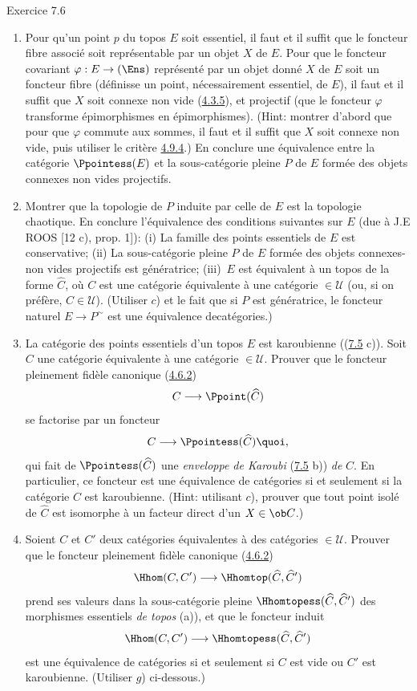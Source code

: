 \documentclass[10pt]{../fichiers-configuration-latex/smfart}
\begin{document}
\begin{enonce*}[remark]{Exercice 7.6}
\begin{enumerate}
\item Pour qu'un point $p$ du topos $E$ soit essentiel, il faut et il
suffit que le foncteur fibre associé soit représentable par un objet
$X$ de $E$. Pour que le foncteur covariant $\varphi:E\rightarrow
(\Ens)$ représenté par un objet donné $X$ de $E$ soit un foncteur
fibre (\ie définisse un point, nécessairement essentiel, de $E$), il
faut et il suffit que $X$ soit connexe non vide
(\hyperref[IV.subsubsec4.3.5]{4.3.5}), et projectif (\ie que le foncteur
$\varphi$ transforme épimorphismes en épimorphismes). (Hint: montrer
d'abord que pour que $\varphi$ commute aux sommes, il faut et il
suffit que $X$ soit connexe non vide, puis utiliser le critère
\hyperref[IV.prop4.9.4]{4.9.4}.) En conclure une équivalence entre la catégorie
$\Ppointess(E)$ et la sous-catégorie pleine $P$ de $E$ formée des
objets connexes non vides projectifs.

\item Montrer que la topologie de $P$ induite par celle de $E$ est la
topologie chaotique. En conclure l'équivalence des conditions
suivantes sur $E$ (due à J.E ROOS [12 c), prop. 1]): (i) La famille
des points essentiels de $E$ est conservative; (ii) La
sous-catégorie pleine $P$ de $E$ formée des objets connexes-non
vides projectifs est génératrice; (iii)~$E$ est équivalent à un
topos de la forme $\widehat{C}$, où $C$ est une catégorie
équivalente à une catégorie $\in 𝒰$ (ou, si on préfère,
$C\in 𝒰$). (Utiliser $c$) et le fait que si $P$ est
génératrice, le foncteur naturel $E\rightarrow P^{\sim}$ est une
équivalence de\pageoriginale catégories.)

\item La catégorie des points essentiels d'un topos $E$ est
karoubienne (\cf (\hyperref[IV.exer7.5]{7.5} c)). Soit $C$ une catégorie
équivalente à une catégorie $\in 𝒰$. Prouver que le foncteur
pleinement fidèle canonique (\hyperref[IV.subsubsec4.6.2]{4.6.2})
$$
C\longrightarrow \Ppoint(\widehat{C})
$$
se factorise par un foncteur
$$
C\longrightarrow \Ppointess(\widehat{C}){\quoi},
$$
qui fait de $\Ppointess(\widehat{C})$ une \emph{enveloppe de
Karoubi} (\hyperref[IV.exer7.5]{7.5} b)) \emph{de} $C$. En particulier, ce
foncteur est une équivalence de catégories si et seulement si la
catégorie $C$ est karoubienne. (Hint: utilisant $c$), prouver que
tout point isolé de $\widehat{C}$ est isomorphe à un facteur direct
d'un $X\in \ob C$.)

\item Soient $C$ et $C'$ deux catégories équivalentes à des catégories
$\in 𝒰$. Prouver que le foncteur pleinement fidèle canonique
(\hyperref[IV.subsubsec4.6.2]{4.6.2})
$$
\Hhom(C,C')\longrightarrow \Hhomtop(\widehat{C},\widehat{C}')
$$
prend ses valeurs dans la sous-catégorie pleine
$\Hhomtopess(\widehat{C},\widehat{C}')$ des morphismes essentiels
\emph{de topos} (a)), et que le foncteur induit
$$
\Hhom(C,C')\longrightarrow \Hhomtopess(\widehat{C},\widehat{C}')
$$
est une équivalence de catégories si et seulement si $C$ est vide ou
$C'$ est karoubienne. (Utiliser $g$) ci-dessous.)


\end{enumerate}
\end{enonce*}
\end{document}
